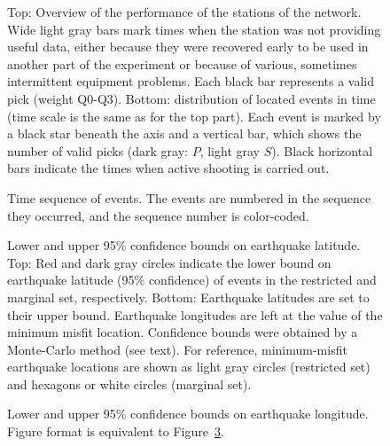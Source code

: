 \documentclass[jgr]{agu2001}
\newlength{\tw}
\begin{document}
\begin{figure}


\caption{Top: Overview of the performance of the stations of the network.
Wide light gray bars mark times when the station was not providing
useful data, either because they were recovered early to be used in
another part of the experiment or because of various, sometimes
intermittent equipment problems.  Each black bar represents a valid
pick (weight Q0-Q3).  Bottom: distribution of located events in time
(time scale is the same as for the top part).  Each event is marked by
a black star beneath the axis and a
vertical bar, which shows the number of valid picks (dark gray: $P$, light
gray $S$).  Black horizontal bars indicate the times when active
shooting is carried out.}
\label{fig:timeline}
\end{figure}

\begin{figure}


\caption{Time sequence of events.  The events are numbered in the
sequence they occurred, and the sequence number is color-coded.}
\label{fig:time-map}
\end{figure}


\begin{figure}



\caption{Lower and upper 95\% confidence bounds on earthquake
latitude.   Top: Red and dark gray circles
indicate the lower bound on earthquake latitude (95\% confidence) of
events in the restricted and marginal set, respectively.
Bottom: Earthquake latitudes are set to their upper bound.
Earthquake longitudes are left at the value of the minimum misfit
location.  Confidence bounds were obtained by a Monte-Carlo method
(see text). For reference, minimum-misfit earthquake locations are shown as 
 light gray circles  (restricted set) and hexagons or white circles
(marginal set). }
\label{fig:map95lat}
\end{figure}


\begin{figure}



\caption{Lower and upper 95\% confidence bounds on earthquake
longitude.  Figure format is equivalent to Figure~\ref{fig:map95lat}. }
\label{fig:map95lon}
\end{figure}
\end{document}
